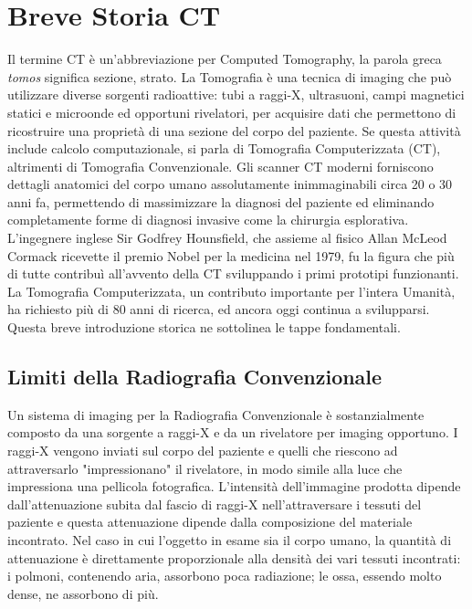 \documentclass[a4paper,12pt, doubleside]{report}
\begin{document}
        \section{Breve Storia CT}
            \par
                Il termine CT è un'abbreviazione per Computed Tomography, la parola greca \textit{tomos} significa sezione, strato. La Tomografia è una tecnica di imaging che può utilizzare diverse sorgenti radioattive: tubi a raggi-X, ultrasuoni, campi magnetici statici e microonde ed opportuni rivelatori, per acquisire dati che permettono di ricostruire una proprietà di una sezione del corpo del paziente. Se questa attività include calcolo computazionale, si parla di Tomografia Computerizzata (CT), altrimenti di Tomografia Convenzionale. Gli scanner CT moderni forniscono dettagli anatomici del corpo umano assolutamente inimmaginabili circa 20 o 30 anni fa, permettendo di massimizzare la diagnosi del paziente ed eliminando completamente forme di diagnosi invasive come la chirurgia esplorativa. L'ingegnere inglese Sir Godfrey Hounsfield, che assieme al fisico Allan McLeod Cormack ricevette il premio Nobel per la medicina nel 1979, fu la figura che più di tutte contribuì all'avvento della CT sviluppando i primi prototipi funzionanti. La Tomografia Computerizzata, un contributo importante per l'intera Umanità, ha richiesto più di 80 anni di ricerca, ed ancora oggi continua a svilupparsi. Questa breve introduzione storica ne sottolinea le tappe fondamentali.
            
            \subsection{Limiti della Radiografia Convenzionale}
                \par
                    Un sistema di imaging per la Radiografia Convenzionale è sostanzialmente composto da una sorgente a raggi-X e da un rivelatore per imaging opportuno. I raggi-X vengono inviati sul corpo del paziente e quelli che riescono ad attraversarlo "impressionano" il rivelatore, in modo simile alla luce che impressiona una pellicola fotografica. L'intensità dell'immagine prodotta dipende dall'attenuazione subita dal fascio di raggi-X nell'attraversare i tessuti del paziente e questa attenuazione dipende dalla composizione del materiale incontrato. Nel caso in cui l’oggetto in esame sia il corpo umano, la quantità di attenuazione è direttamente proporzionale alla densità dei vari tessuti incontrati: i polmoni, contenendo aria, assorbono poca radiazione; le ossa, essendo molto dense, ne assorbono di più.
                            
\end{document}
